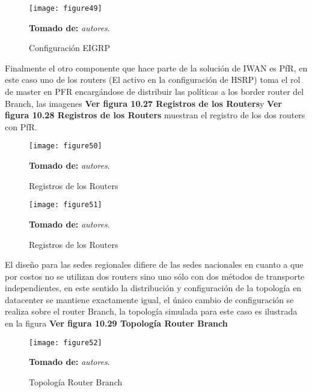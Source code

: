 \begin{figure}[htbp]
  \centering
    {\texttt{[image: figure49]}}%
  \caption{Configuración EIGRP}
  \textbf{Tomado de:} \textit{autores}.
  \label{fig:fig2subfig}
\end{figure}

Finalmente el otro componente que hace parte de la solución de IWAN es PfR, en este caso uno de los routers (El activo en la configuración de HSRP) toma el rol de master en PFR encargándose de distribuir las políticas a los border router del Branch, las imagenes \textbf{Ver figura 10.27 Registros de los Routers}y \textbf{Ver figura 10.28 Registros de los Routers} muestran el registro de los dos routers con PfR.

\begin{figure}[htbp]
  \centering
    {\texttt{[image: figure50]}}%
  \caption{Registros de los Routers}
  \textbf{Tomado de:} \textit{autores}.
  \label{fig:fig2subfig}
\end{figure}


\begin{figure}[htbp]
  \centering
    {\texttt{[image: figure51]}}%
  \caption{Registros de los Routers}
  \textbf{Tomado de:} \textit{autores}.
  \label{fig:fig2subfig}
\end{figure}

El diseño para las sedes regionales difiere de las sedes nacionales en cuanto a que por costos no se utilizan dos routers sino uno sólo con dos métodos de transporte independientes, en este sentido la distribución y configuración de la topología en datacenter se mantiene exactamente igual, el único cambio de configuración se realiza sobre el router Branch, la topología simulada para este caso es ilustrada en la figura \textbf{Ver figura 10.29 Topología Router Branch}

\begin{figure}[htbp]
  \centering
    {\texttt{[image: figure52]}}%
  \caption{Topología Router Branch}
  \textbf{Tomado de:} \textit{autores}.
  \label{fig:fig2subfig}
\end{figure}

